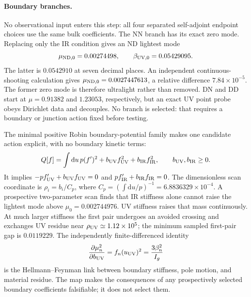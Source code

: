\documentclass[10pt]{article}
\newcommand{\dd}{\mathrm{d}}
\begin{document}
\paragraph{Boundary branches.}
No observational input enters this step: all four separated self-adjoint
endpoint choices use the same bulk coefficients.  The NN branch has its
exact zero mode.  Replacing only the IR condition gives an ND lightest mode
\begin{equation}
 \mu_{\rm ND,0}=0.00274498,\qquad
 \beta_{\rm UV,0}=0.05429095.
\end{equation}
The latter is $0.0542910$ at seven decimal places.
An independent continuous-shooting calculation gives
$\mu_{\rm ND,0}=0.0027447613$, a relative difference
$7.84\times10^{-5}$.  The former zero mode is therefore ultralight rather than
removed.  DN and DD start at $\mu=0.91382$ and $1.23053$, respectively, but an
exact UV point probe obeys Dirichlet data and decouples.  No branch is selected:
that requires a boundary or junction action fixed before testing.

The minimal positive Robin boundary-potential family makes one candidate
action explicit, with no boundary kinetic terms:
\begin{equation}
 Q[f]=\int\dd u\,p(f')^2+b_{\rm UV}f_{\rm UV}^2+b_{\rm IR}f_{\rm IR}^2,
 \qquad b_{\rm UV},b_{\rm IR}\geq0 .
 \label{eq:robinfamily}
\end{equation}
It implies $-p f'_{\rm UV}+b_{\rm UV}f_{\rm UV}=0$ and
$p f'_{\rm IR}+b_{\rm IR}f_{\rm IR}=0$.  The dimensionless scan coordinate is
$\rho_i=b_i/C_p$, where
$C_p=(\int\dd u/p)^{-1}=6.8836329\times10^{-4}$.  A prospective two-parameter scan
finds that IR stiffness alone cannot raise the lightest mode above
$\mu_0=0.002744976$.  UV stiffness raises that mass continuously.  At much
larger stiffness the first pair undergoes an avoided crossing and exchanges
UV residue near $\rho_{\rm UV}\simeq1.12\times10^5$; the minimum sampled
first-pair gap is $0.0119229$.
The independently finite-differenced identity
\begin{equation}
 \frac{\partial\mu_n^2}{\partial b_{\rm UV}}
 =f_n(u_{\rm UV})^2=\frac{3\beta_n^2}{I_g}
 \label{eq:robinhf}
\end{equation}
is the Hellmann--Feynman link between boundary stiffness, pole motion, and
material residue.  The map makes the consequences of any prospectively
selected boundary coefficients falsifiable; it does not select them.
\end{document}
